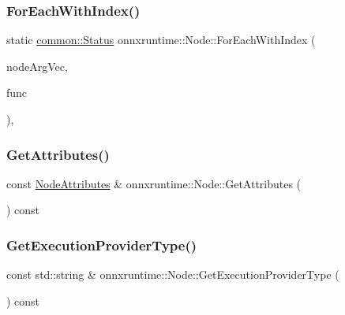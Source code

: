\subsubsection{\texorpdfstring{For\+Each\+With\+Index()}{ForEachWithIndex()}}
{\footnotesize\ttfamily static \mbox{\hyperlink{classonnxruntime_1_1common_1_1Status}{common\+::\+Status}} onnxruntime\+::\+Node\+::\+For\+Each\+With\+Index (\begin{DoxyParamCaption}\item[{const \mbox{\hyperlink{classonnxruntime_1_1ConstPointerContainer}{Const\+Pointer\+Container}}$<$ std\+::vector$<$ \mbox{\hyperlink{classonnxruntime_1_1NodeArg}{Node\+Arg}} $\ast$$>$$>$ \&}]{node\+Arg\+Vec,  }\item[{std\+::function$<$ \mbox{\hyperlink{classonnxruntime_1_1common_1_1Status}{common\+::\+Status}}(const \mbox{\hyperlink{classonnxruntime_1_1NodeArg}{Node\+Arg}} \&arg, \mbox{\hyperlink{mlasi_8h_a503efbc1c6e50825320ad909366b78ab}{size\+\_\+t}} index)$>$}]{func }\end{DoxyParamCaption})\hspace{0.3cm}{\ttfamily [inline]}, {\ttfamily [static]}}

\mbox{\label{classonnxruntime_1_1Node_aa90b8e7a87ff750bf9c6fcc652a654d8}} 
\subsubsection{\texorpdfstring{Get\+Attributes()}{GetAttributes()}}
{\footnotesize\ttfamily const \mbox{\hyperlink{namespaceonnxruntime_a7fa616c461850e300cfa552afd46eed4}{Node\+Attributes}} \& onnxruntime\+::\+Node\+::\+Get\+Attributes (\begin{DoxyParamCaption}{ }\end{DoxyParamCaption}) const\hspace{0.3cm}{\ttfamily [noexcept]}}

\mbox{\label{classonnxruntime_1_1Node_aea516a6bafb57be8a8497b2f45c307e5}} 
\subsubsection{\texorpdfstring{Get\+Execution\+Provider\+Type()}{GetExecutionProviderType()}}
{\footnotesize\ttfamily const std\+::string \& onnxruntime\+::\+Node\+::\+Get\+Execution\+Provider\+Type (\begin{DoxyParamCaption}{ }\end{DoxyParamCaption}) const\hspace{0.3cm}{\ttfamily [noexcept]}}

